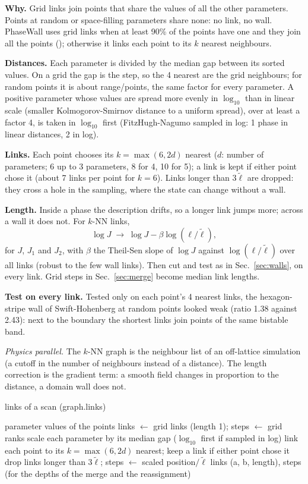 \documentclass[11pt,a4paper]{article}
\newcommand{\code}[1]{\texttt{\detokenize{#1}}}
\newcommand{\pw}{PhaseWall}
\begin{document}
\begin{tech}
\textbf{Why.} Grid links join points that share the values of all the other parameters. Points at
random or space-filling parameters share none: no link, no wall. \pw{} uses grid links when at least
90\% of the points have one and they join all the points (\code{GRID_SHARE}); otherwise it links each
point to its $k$ nearest neighbours.

\textbf{Distances.} Each parameter is divided by the median gap between its sorted values. On a grid
the gap is the step, so the 4 nearest are the grid neighbours; for random points it is about
range/points, the same factor for every parameter. A positive parameter whose values are spread more
evenly in $\log_{10}$ than in linear scale (smaller Kolmogorov-Smirnov distance to a uniform spread),
over at least a factor 4, is taken in $\log_{10}$ first (FitzHugh-Nagumo sampled in log: 1 phase in
linear distances, 2 in log).

\textbf{Links.} Each point chooses its $k=\max(6,2d)$ nearest ($d$: number of parameters; 6 up to 3
parameters, 8 for 4, 10 for 5); a link is kept if either point chose it (about 7 links per point for
$k=6$). Links longer than $3\tilde\ell$ are dropped: they cross a hole in the sampling, where
the state can change without a wall.

\textbf{Length.} Inside a phase the description drifts, so a longer link jumps more; across a wall it
does not. For $k$-NN links,
\[
\log J\;\to\;\log J-\beta\log(\ell/\tilde\ell),
\]
for $J$, $J_1$ and $J_2$, with $\beta$ the Theil-Sen slope of $\log J$ against $\log(\ell/\tilde\ell)$
over all links (robust to the few wall links). Then cut and test as in Sec.~\ref{sec:walls}, on every
link. Grid steps in Sec.~\ref{sec:merge} become median link lengths.

\textbf{Test on every link.} Tested only on each point's 4 nearest links, the hexagon-stripe wall of
Swift-Hohenberg at random points looked weak (ratio 1.38 against 2.43): next to the boundary the
shortest links join points of the same bistable band.

\emph{Physics parallel.} The $k$-NN graph is the neighbour list of an off-lattice simulation (a cutoff
in the number of neighbours instead of a distance). The length correction is the gradient term: a
smooth field changes in proportion to the distance, a domain wall does not.
\end{tech}

\begin{algobox}{links of a scan (graph.links)}
\begin{algorithmic}[1]
\Require parameter values of the points
  \State links $\gets$ grid links (length 1); steps $\gets$ grid ranks
\Else
  \State scale each parameter by its median gap ($\log_{10}$ first if sampled in log)
  \State link each point to its $k=\max(6,2d)$ nearest; keep a link if either point chose it
  \State drop links longer than $3\tilde\ell$; steps $\gets$ scaled position$/\tilde\ell$
\EndIf
\Ensure links (a, b, length), steps (for the depths of the merge and the reassignment)
\end{algorithmic}
\end{algobox}
\end{document}

